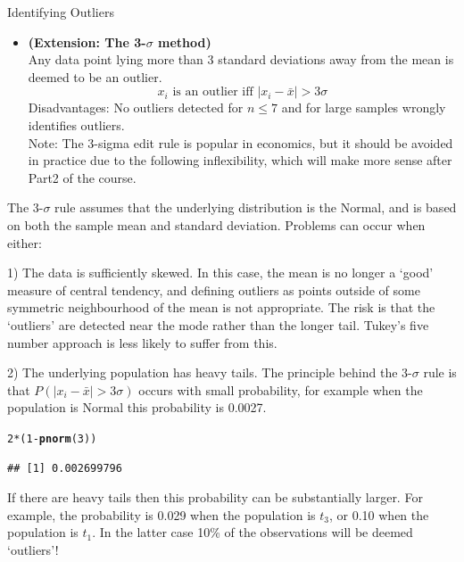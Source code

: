 \documentclass[t,xcolor=pdftex,dvipsnames,table]{beamer}
\makeatletter
\newcommand{\hlnum}[1]{\textcolor[rgb]{0.686,0.059,0.569}{#1}}%
\newcommand{\hlopt}[1]{\textcolor[rgb]{0,0,0}{#1}}%
\newcommand{\hlstd}[1]{\textcolor[rgb]{0.345,0.345,0.345}{#1}}%
\newcommand{\hlkwd}[1]{\textcolor[rgb]{0.737,0.353,0.396}{\textbf{#1}}}%
\newenvironment{kframe}{%
 \def\at@end@of@kframe{}%
 \ifinner\ifhmode%
  \def\at@end@of@kframe{\end{minipage}}%
  \begin{minipage}{\columnwidth}%
 \fi\fi%
 \def\FrameCommand##1{\hskip\@totalleftmargin \hskip-\fboxsep
 \colorbox{shadecolor}{##1}\hskip-\fboxsep
     \hskip-\linewidth \hskip-\@totalleftmargin \hskip\columnwidth}%
 \MakeFramed {\advance\hsize-\width
   \@totalleftmargin\z@ \linewidth\hsize
   \@setminipage}}%
 {\par\unskip\endMakeFramed%
 \at@end@of@kframe}
\newenvironment{knitrout}{}{} %
\makeatother
\begin{document}
\begin{frame}[fragile]{Identifying Outliers}
\begin{itemize}
\item {\bf (Extension: The 3-$\sigma$ method)} \\
Any data point lying more than 3 standard deviations away from the mean is deemed to be an outlier. \\
\[ x_{i} \mbox{ is an outlier iff } |x_{i} - \bar{x}| > 3 \sigma  \]
Disadvantages:  No outliers detected for $n \leq 7$ and for large samples wrongly identifies outliers. \\

\vspace{.5cm}
Note: The 3-sigma edit rule is popular in economics, but it should be avoided in practice due to the following inflexibility, which will make more sense after Part2 of the course. 
\end{itemize}
\end{frame}

\begin{frame}[fragile]{}
The 3-$\sigma$ rule assumes that the underlying distribution is the Normal, and is based on both the sample mean and standard deviation. Problems can occur when either:

\vspace{.5cm}
1) The data is sufficiently skewed. In this case, the mean is no longer a `good' measure of central tendency, and defining outliers as points outside of some symmetric neighbourhood of the mean is not appropriate. The risk is that the `outliers' are detected near the mode rather than the longer tail. Tukey's five number approach is less likely to suffer from this.  
\end{frame}

\begin{frame}[fragile]{}
2) The underlying population has heavy tails. The principle behind the 3-$\sigma$ rule is that $P(  |x_{i} - \bar{x}| > 3 \sigma)$ occurs with small probability, for example when the population is Normal this probability is 0.0027. 

\begin{knitrout}
\color{fgcolor}\begin{kframe}
\begin{alltt}
\hlnum{2}\hlopt{*}\hlstd{(}\hlnum{1}\hlopt{-}\hlkwd{pnorm}\hlstd{(}\hlnum{3}\hlstd{))}
\end{alltt}
\begin{verbatim}
## [1] 0.002699796
\end{verbatim}
\end{kframe}
\end{knitrout}

\vspace{.5cm}
If there are heavy tails then this probability can be substantially larger. For example, the probability is 0.029 when the population is $t_{3}$, or 0.10 when the population is $t_{1}$. In the latter case 10\% of the observations will be deemed `outliers'!


\end{frame}
\end{document}
